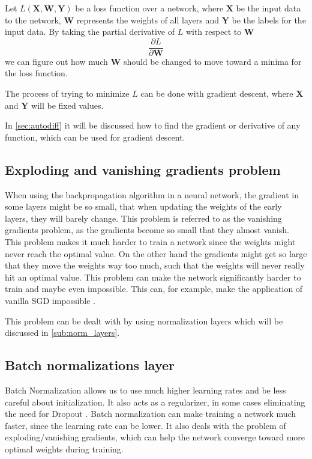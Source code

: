 Let $L(\bm{X}, \bm{W}, \bm{Y})$ be a loss function over a network, where $\bm{X}$ be the input data to the network, $\bm{W}$ represents the weights of all layers and $\bm{Y}$ be the labels for the input data.
By taking the partial derivative of $L$ with respect to $\bm{W}$
$$\frac{\partial L}{\partial \bm{W}}$$
we can figure out how much $\bm{W}$ should be changed to move toward a minima for the loss function.

The process of trying to minimize $L$ can be done with gradient descent, where $\bm{X}$ and $\bm{Y}$ will be fixed values.

In \autoref{sec:autodiff} it will be discussed how to find the gradient or derivative of any function, which can be used for gradient descent.

\subsection{Exploding and vanishing gradients problem}

When using the backpropagation algorithm in a neural network, the gradient in some layers might be so small, that when updating the weights of the early layers, they will barely change. This problem is referred to as the vanishing gradients problem, as the gradients become so small that they almost vanish.
This problem makes it much harder to train a network since the weights might never reach the optimal value.
On the other hand the gradients might get so large that they move the weights way too much, such that the weights will never really hit an optimal value.
This problem can make the network significantly harder to train and maybe even impossible. This can, for example, make the application of vanilla SGD impossible \cite{exploding_gradients}.

This problem can be dealt with by using normalization layers which will be discussed in \autoref{sub:norm_layers}.



\subsection{Batch normalizations layer}%
\label{sub:norm_layers}

\guillemotleft Batch Normalization allows us to use much higher learning rates and
be less careful about initialization. It also acts as a regularizer,
in some cases eliminating the need for Dropout \guillemotright \cite{batch_norm}.
Batch normalization can make training a network much faster, since the learning rate can be lower.
It also deals with the problem of exploding/vanishing gradients, which can help the network converge toward more optimal weights during training.

